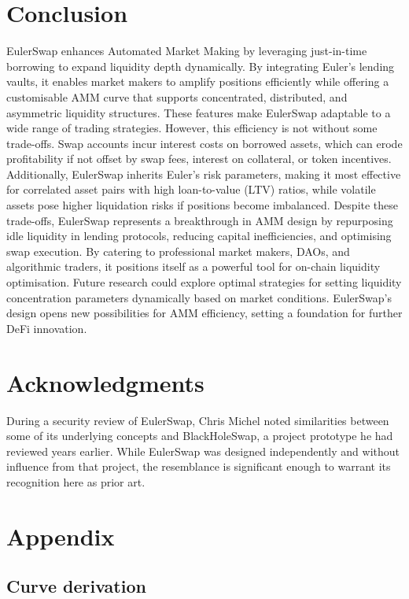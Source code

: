 \documentclass{article}
\begin{document}
\section{Conclusion}

EulerSwap enhances Automated Market Making by leveraging just-in-time borrowing to expand liquidity depth dynamically. By integrating Euler’s lending vaults, it enables market makers to amplify positions efficiently while offering a customisable AMM curve that supports concentrated, distributed, and asymmetric liquidity structures. These features make EulerSwap adaptable to a wide range of trading strategies. However, this efficiency is not without some trade-offs. Swap accounts incur interest costs on borrowed assets, which can erode profitability if not offset by swap fees, interest on collateral, or token incentives. Additionally, EulerSwap inherits Euler’s risk parameters, making it most effective for correlated asset pairs with high loan-to-value (LTV) ratios, while volatile assets pose higher liquidation risks if positions become imbalanced. Despite these trade-offs, EulerSwap represents a breakthrough in AMM design by repurposing idle liquidity in lending protocols, reducing capital inefficiencies, and optimising swap execution. By catering to professional market makers, DAOs, and algorithmic traders, it positions itself as a powerful tool for on-chain liquidity optimisation. Future research could explore optimal strategies for setting liquidity concentration parameters dynamically based on market conditions. EulerSwap's design opens new possibilities for AMM efficiency, setting a foundation for further DeFi innovation.

\section*{Acknowledgments}

During a security review of EulerSwap, Chris Michel noted similarities between some of its underlying concepts and BlackHoleSwap, a project prototype he had reviewed years earlier. While EulerSwap was designed independently and without influence from that project, the resemblance is significant enough to warrant its recognition here as prior art.

\newpage
\section{Appendix}
\label{sec:appendix}

\subsection{Curve derivation}
\label{sec:curve-derivation}
\end{document}
